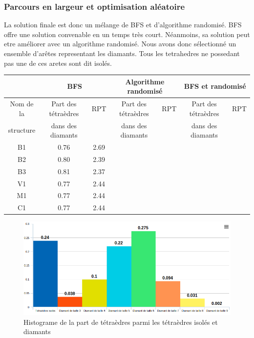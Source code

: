 \documentclass[a4paper,11pt,openany]{article}
\begin{document}
\subsubsection{Parcours en largeur et optimisation aléatoire}
\noindent
La solution finale est donc un mélange de BFS et d'algorithme randomisé. BFS offre une solution convenable en un temps très court. Néanmoins, sa solution peut etre améliorer avec un algorithme randomisé.
Nous avons donc sélectionné un ensemble d'arêtes representant les diamants. Tous les tetrahedres ne possedant pas une de ces aretes sont dit isolés.
\begin{table}[H]
\footnotesize
\begin{tabular}{|c | c | c | c| c | c | c |}
\hline
& \multicolumn{2}{|c|}{BFS}& \multicolumn{2}{|c|}{Algorithme randomisé} & \multicolumn{2}{|c|}{BFS et randomisé}\\
\hline
Nom de la & Part des tétraèdres & RPT& Part des tétraèdres & RPT& Part des tétraèdres & RPT\\
structure&dans des diamants&&dans des diamants&&dans des diamants&\\
\hline
B1 & 0.76 & 2.69\\
B2 &  0.80 & 2.39\\
B3 & 0.81 & 2.37\\ 
V1 & 0.77 & 2.44\\ 
M1 &  0.77 & 2.44\\ 
C1 &  0.77 & 2.44\\ 
\hline  
\end{tabular}
\label{Tab:results_performances}
\end{table}
\begin{figure}[H]
\begin{center}
\includegraphics[scale=0.45]{Images/histograme}
\caption{Histograme de la part de tétraèdres parmi les tétraèdres isolés et diamants}
\label{fig:bfs_starting}
\end{center}
\end{figure}
\end{document}
